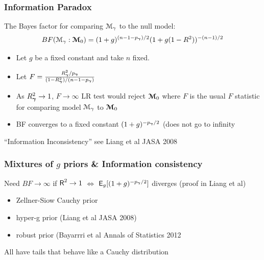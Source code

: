 \documentclass[]{beamer}
\begin{document}
\begin{frame}
  \frametitle{Information Paradox}
  
The Bayes factor for comparing ${\cal M}_\gamma$ to the null
model:
$$
 BF({\cal M}_\gamma : \boldsymbol{{\cal M}}_0) =    (1 + g)^{(n - 1 - p_{\boldsymbol{\gamma}})/2} (1 + g(1 - R^2))^{-(n-1)/2}
$$
\pause
\begin{itemize}
\item Let $g$ be a fixed constant and take $n$ fixed. \pause
\item Let $F = \frac{R_{\boldsymbol{\gamma}}^2/p_{\boldsymbol{\gamma}}}{(1 - R_{\boldsymbol{\gamma}}^2)/(n - 1 - p_{\boldsymbol{\gamma}})}$ \pause
\item As $R^2_{\boldsymbol{\gamma}} \to 1$, $F \to \infty$ LR test would reject $\boldsymbol{{\cal M}}_0$
  where $F$ is the usual $F$ statistic for  comparing model ${\cal M}_\gamma$ to
  $\boldsymbol{{\cal M}}_0$ \pause 
\item BF converges to a fixed constant $(1+g)^{-p_{\boldsymbol{\gamma}}/2}$  (does not go
  to infinity
\end{itemize}

``Information Inconsistency''  see Liang et al JASA 2008


\end{frame}
\begin{frame}
  \frametitle{Mixtures of $g$ priors \& Information consistency}
  
Need $BF \to \infty$ if $\textsf{R}^2 \to 1$  $\Leftrightarrow$ $\textsf{E}_g[(1 +
g)^{-p_{\boldsymbol{\gamma}}/2}]$ diverges  (proof in Liang et al)
\pause
\begin{itemize}
\item Zellner-Siow Cauchy prior \pause
\item hyper-g prior (Liang et al JASA 2008) \pause
\item robust prior (Bayarrri et al Annals of Statistics 2012 \pause
\end{itemize}

 All have tails that behave like a Cauchy distribution
\end{frame}
\end{document}
